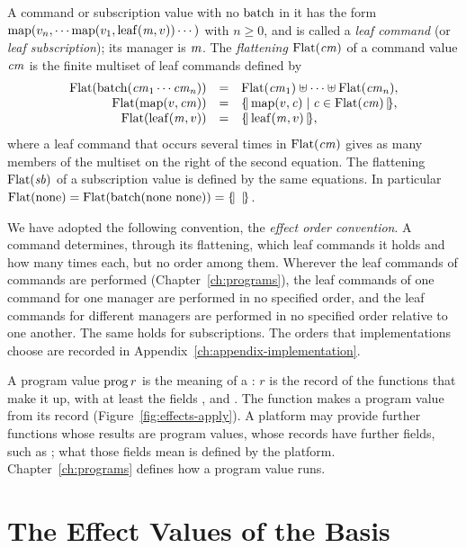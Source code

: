 A command or subscription value with no $\mathrm{batch}$ in it has the form
$\mathrm{map}(v_n,\cdots\mathrm{map}(v_1,\mathrm{leaf}(\mathit{m},v))\cdots)$ with $n\geq 0$, and
is called a \emph{leaf command} (or \emph{leaf subscription}); its manager is
$\mathit{m}$. The \emph{flattening} $\mathrm{Flat}(\mathit{cm})$ of a command value $\mathit{cm}$ is the
finite multiset of leaf commands defined by
\[
  \begin{array}{rcl}
  \mathrm{Flat}(\mathrm{batch}(\mathit{cm}_1\cdots\mathit{cm}_n)) &=&
    \mathrm{Flat}(\mathit{cm}_1)\uplus\cdots\uplus\mathrm{Flat}(\mathit{cm}_n),\\
  \mathrm{Flat}(\mathrm{map}(v,\mathit{cm})) &=&
    \{\!|\,\mathrm{map}(v,\mathit{c})\mid \mathit{c}\in\mathrm{Flat}(\mathit{cm})\,|\!\},\\
  \mathrm{Flat}(\mathrm{leaf}(\mathit{m},v)) &=& \{\!|\,\mathrm{leaf}(\mathit{m},v)\,|\!\},
  \end{array}
\]
where a leaf command that occurs several times in $\mathrm{Flat}(\mathit{cm})$ gives as
many members of the multiset on the right of the second equation. The
flattening $\mathrm{Flat}(\mathit{sb})$ of a subscription value is defined by the same
equations. In particular
$\effFlat(\effnone)=\effFlat(\effbatch(\effnone\ \effnone))=\effmset{\,}$.

We have adopted the following convention, the \emph{effect order convention}.
A command determines, through its flattening, which leaf commands it holds
and how many times each, but no order among them. Wherever the leaf
commands of commands are performed (Chapter~\ref{ch:programs}), the leaf
commands of one command for one manager are performed in no specified order,
and the leaf commands for different managers are performed in no specified
order relative to one another. %
The same holds for subscriptions. The orders that implementations choose are
recorded in Appendix~\ref{ch:appendix-implementation}.

A program value $\mathrm{prog}\,r$ is the meaning of a : $r$ is the
record of the functions that make it up, with at least the fields ,
 and . The function  makes a
program value from its record (Figure~\ref{fig:effects-apply}). A platform
may provide further functions whose results are program values, whose
records have further fields, such as ; what those fields mean is
defined by the platform. %
Chapter~\ref{ch:programs} defines how a program value runs.

\section{The Effect Values of the Basis}\label{sec:effects-apply}

